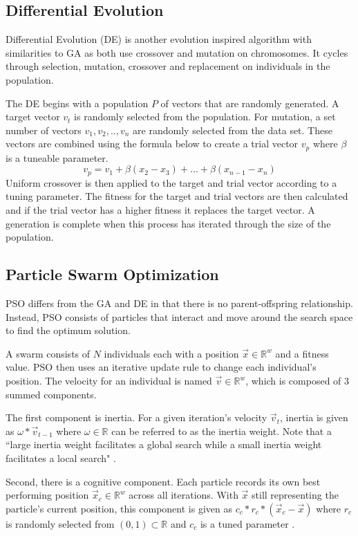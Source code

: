 \documentclass[twoside,11pt]{article}
\newcommand{\Rw}{\mathbb{R}^w }
\begin{document}
\subsection{Differential Evolution}
Differential Evolution (DE) is another evolution inspired algorithm with  similarities to GA as both use crossover and mutation on chromosomes. It cycles through selection, mutation, crossover and replacement on individuals in the population.

The DE begins with a population $P$ of vectors that are randomly generated. A target vector $v_t$ is randomly selected from the population. For mutation, a set number of vectors $v_1, v_2,.., v_n$ are randomly selected from the data set. These vectors are combined using the formula below to create a trial vector $v_p$ where $\beta$ is a tuneable parameter. $$v_p = v_1 + \beta(x_2 - x_3) + ... + \beta(x_{n-1} - x_n)$$
Uniform crossover is then applied to the target and trial vector according to a tuning parameter. The fitness for the target and trial vectors are then calculated and if the trial vector has a higher fitness it replaces the target vector. A generation is complete when this process has iterated through the size of the population. 

\subsection{Particle Swarm Optimization}

	PSO differs from the GA and DE in that there is no parent-offspring relationship. Instead, PSO consists of particles that interact and move around the search space to find the optimum solution. 
	
	A swarm consists of $N$ individuals each with a position $\vec{x} \in \Rw$ and a fitness value. 
	PSO then uses an iterative update rule to change each individual's position. The velocity for an individual is named $\vec{v} \in \Rw$, which is composed of 3 summed components.
	
	The first component is inertia. For a given iteration's velocity $\vec{v}_t$, inertia is given as $\omega * \vec{v}_{t-1}$ where $\omega \in \mathbb{R}$ can be referred to as the inertia weight. Note that a ``large inertia weight facilitates a global search while a small inertia weight facilitates a local search" \citep{empirical-pso}.
	
	Second, there is a cognitive component. 
	Each particle records its own best performing position $\vec{x}_c \in \Rw$ across all iterations. 
	With $\vec{x}$ still representing the particle's current position, this component is given as $c_c * r_c * (\vec{x}_c - \vec{x})$ where $r_c$ is randomly selected from $(0,1) \subset \mathbb{R}$ and $c_c$ is a tuned parameter \citep{og-pso}.
	
\end{document}
